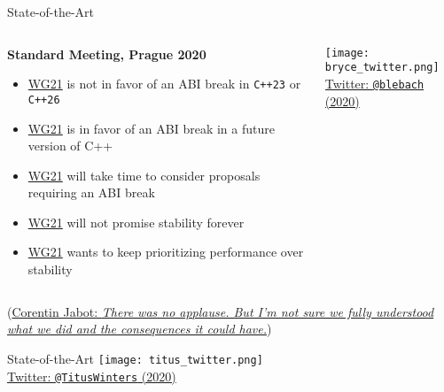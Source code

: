 \begin{frame}{State-of-the-Art}
    \begin{columns}
        \begin{column}{.45\textwidth}
            \textbf{Standard Meeting, Prague 2020}
            \begin{itemize}
                \item \href{http://www.open-std.org/jtc1/sc22/wg21/}{WG21} is not in favor of an ABI break in \texttt{C++23} or \texttt{C++26}
                \item \href{http://www.open-std.org/jtc1/sc22/wg21/}{WG21} is in favor of an ABI break in a future version of C++
                \item \href{http://www.open-std.org/jtc1/sc22/wg21/}{WG21} will take time to consider proposals requiring an ABI break 
                \item \href{http://www.open-std.org/jtc1/sc22/wg21/}{WG21} will not promise stability forever
                \item \href{http://www.open-std.org/jtc1/sc22/wg21/}{WG21} wants to keep prioritizing performance over stability
            \end{itemize}
        \end{column}
        \begin{column}{.45\textwidth}
            \centering
            \texttt{[image: bryce\_twitter.png]}\\
            {\footnotesize \href{https://twitter.com/blelbach/status/1228962495865507840}{Twitter: \texttt{@blebach} (2020)}}

        \end{column}
    \end{columns}

    \vspace*{5mm}

    (\href{https://cor3ntin.github.io/posts/abi/}{Corentin Jabot: \textit{There was no applause. But I’m not sure we fully understood what we did and the consequences it could have.}})
\end{frame}

\begin{frame}{State-of-the-Art}
    \centering
    \texttt{[image: titus\_twitter.png]}\\
    {\footnotesize \href{https://twitter.com/TitusWinters/status/1224377740306132998}{Twitter: \texttt{@TitusWinters} (2020)}}
\end{frame}

